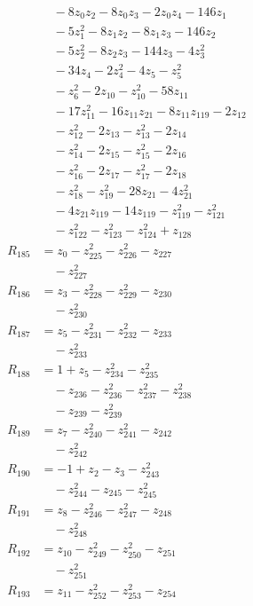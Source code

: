 \begin{align*}
&\quad -8z_{0}z_{2} -8z_{0}z_{3} -2z_{0}z_{4} -146z_{1} \\
&\quad -5z_{1}^{2} -8z_{1}z_{2} -8z_{1}z_{3} -146z_{2} \\
&\quad -5z_{2}^{2} -8z_{2}z_{3} -144z_{3} -4z_{3}^{2} \\
&\quad -34z_{4} -2z_{4}^{2} -4z_{5} -z_{5}^{2} \\
&\quad -z_{6}^{2} -2z_{10} -z_{10}^{2} -58z_{11} \\
&\quad -17z_{11}^{2} -16z_{11}z_{21} -8z_{11}z_{119} -2z_{12} \\
&\quad -z_{12}^{2} -2z_{13} -z_{13}^{2} -2z_{14} \\
&\quad -z_{14}^{2} -2z_{15} -z_{15}^{2} -2z_{16} \\
&\quad -z_{16}^{2} -2z_{17} -z_{17}^{2} -2z_{18} \\
&\quad -z_{18}^{2} -z_{19}^{2} -28z_{21} -4z_{21}^{2} \\
&\quad -4z_{21}z_{119} -14z_{119} -z_{119}^{2} -z_{121}^{2} \\
&\quad -z_{122}^{2} -z_{123}^{2} -z_{124}^{2} +z_{128} \\
R_{185} &= z_{0} -z_{225}^{2} -z_{226}^{2} -z_{227} \\
&\quad -z_{227}^{2} \\
R_{186} &= z_{3} -z_{228}^{2} -z_{229}^{2} -z_{230} \\
&\quad -z_{230}^{2} \\
R_{187} &= z_{5} -z_{231}^{2} -z_{232}^{2} -z_{233} \\
&\quad -z_{233}^{2} \\
R_{188} &= 1 +z_{5} -z_{234}^{2} -z_{235}^{2} \\
&\quad -z_{236} -z_{236}^{2} -z_{237}^{2} -z_{238}^{2} \\
&\quad -z_{239} -z_{239}^{2} \\
R_{189} &= z_{7} -z_{240}^{2} -z_{241}^{2} -z_{242} \\
&\quad -z_{242}^{2} \\
R_{190} &= -1 +z_{2} -z_{3} -z_{243}^{2} \\
&\quad -z_{244}^{2} -z_{245} -z_{245}^{2} \\
R_{191} &= z_{8} -z_{246}^{2} -z_{247}^{2} -z_{248} \\
&\quad -z_{248}^{2} \\
R_{192} &= z_{10} -z_{249}^{2} -z_{250}^{2} -z_{251} \\
&\quad -z_{251}^{2} \\
R_{193} &= z_{11} -z_{252}^{2} -z_{253}^{2} -z_{254} \\

\end{align*}
